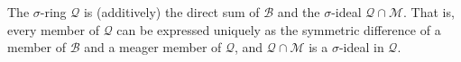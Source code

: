 The $\sigma$-ring $\mathcal{Q}$ is (additively) the direct sum of $\mathcal{B}$ and the $\sigma$-ideal $\mathcal{Q} \cap \mathcal{M}$. That is, every member of $\mathcal{Q}$ can be expressed uniquely as the symmetric difference of a member of $\mathcal{B}$ and a meager member of $\mathcal{Q}$, and $\mathcal{Q} \cap \mathcal{M}$ is a $\sigma$-ideal in $\mathcal{Q}$.

